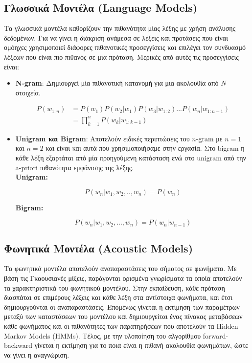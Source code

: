 \documentclass[a4paper, 12pt]{article}
\begin{document}
    
    \subsection*{Γλωσσικά Μοντέλα (Language Models)}
    
        Τα γλωσσικά μοντέλα καθορίζουν την πιθανότητα μίας λέξης με χρήση ανάλυσης δεδομένων. Για να γίνει η διάκριση ανάμεσα σε λέξεις και προτάσεις που είναι ομόηχες χρησιμοποιεί διάφορες πιθανοτικές προσεγγίσεις και επιλέγει τον συνδυασμό λέξεων που είναι πιο πιθανός σε μια πρόταση. Μερικές από αυτές τις προσεγγίσεις είναι:
      
        \begin{itemize}
            \item \textbf{Ν-gram}: Δημιουργεί μία πιθανοτική κατανομή για μια ακολουθία από $N$ στοιχεία. 
        
        \begin{align*}
            P(w_{1:n}) &= P(w_1)P(w_2|w_1)P(w_3|w_{1:2})...P(w_n|w_{1:n-1}) \\
                      &= \prod_{k=1}^{n} P(w_k|w_{1:k-1})
        \end{align*}
            
            \item \textbf{Unigram και Bigram}: Αποτελούν ειδικές περιπτώσεις του $n$-gram με $n = 1$ και $n = 2$ και είναι και αυτά που χρησιμοποιήσαμε στην εργασία. Στο bigram η κάθε λέξη εξαρτάται από μία προηγούμενη κατάσταση ενώ στο unigram από την a-priori πιθανότητα εμφάνισης της λέξης. \\
            
            \textbf{Unigram:}
            
            \[
                P ( w_n | w_1,w_2,..,w_n ) = P(w_n)
            \] 
            
            
            \textbf{Bigram:} 
            
            \[
                P(w_n|w_1,w_2,...,w_n) = P(w_n|w_{n-1})
            \]
        \end{itemize}
    
    \subsection*{Φωνητικά Μοντέλα (Acoustic Models)}
        Τα φωνητικά μοντέλα αποτελούν αναπαραστάσεις του σήματος σε φωνήματα. Με βάση τις Γκαουσιανές μίξεις, παράγονται ορισμένα γνωρίσματα τα οποία αποτελούν τα χαρακτηριστικά του φωνητικού μοντέλου. Στην εκπαίδευση, κάθε πρόταση διασπάται σε επιμέρους λέξεις και κάθε λέξη στα αντίστοιχα φωνήματα, και έτσι δημιουργούνται οι αναπαραστάσεις. Επομένως γίνεται η εκτίμηση των παραμέτρων μεταξύ των καταστάσεων του μοντέλου και δημιουργείται ένας πίνακας μεταβάσεων κάθε φωνήματος και οι πιθανότητες των παρατηρήσεων που αποτελούν τα Hidden Markov Models (HMMs). Τέλος, με την υλοποίηση του αλγορίθμου forward-backward γίνεται η εκτίμηση για το ποια είναι η πιθανή ακολουθία φωνημάτων, ώστε να γίνει η αναγνώριση. 
        
\end{document}
